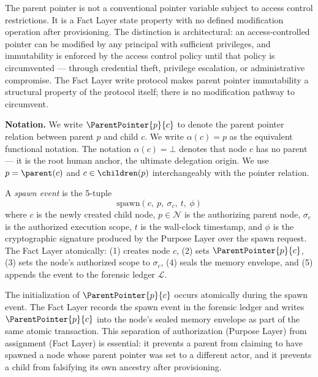 The parent pointer is not a conventional pointer variable subject to access control restrictions. It is a Fact Layer state property with no defined modification operation after provisioning. The distinction is architectural: an access-controlled pointer can be modified by any principal with sufficient privileges, and immutability is enforced by the access control policy until that policy is circumvented --- through credential theft, privilege escalation, or administrative compromise. The Fact Layer write protocol makes parent pointer immutability a structural property of the protocol itself; there is no modification pathway to circumvent.

\bigskip
\noindent\textbf{Notation.} We write $\ParentPointer{p}{c}$ to denote the parent pointer relation between parent $p$ and child $c$. We write $\alpha(c) = p$ as the equivalent functional notation. The notation $\alpha(c) = \bot$ denotes that node $c$ has no parent --- it is the root human anchor, the ultimate delegation origin. We use $p = \parent(c)$ and $c \in \children(p)$ interchangeably with the pointer relation.

\begin{dfn}
\label{dfn:spawn-event}
A \emph{spawn event} is the 5-tuple
\begin{equation}
\mathrm{spawn}(c,\ p,\ \sigma_c,\ t,\ \phi)
\end{equation}
where $c$ is the newly created child node, $p \in \mathcal{N}$ is the authorizing parent node, $\sigma_c$ is the authorized execution scope, $t$ is the wall-clock timestamp, and $\phi$ is the cryptographic signature produced by the Purpose Layer over the spawn request. The Fact Layer atomically: (1) creates node $c$, (2) sets $\ParentPointer{p}{c}$, (3) sets the node's authorized scope to $\sigma_c$, (4) seals the memory envelope, and (5) appends the event to the forensic ledger $\mathcal{L}$.
\end{dfn}

The initialization of $\ParentPointer{p}{c}$ occurs atomically during the spawn event. The Fact Layer records the spawn event in the forensic ledger and writes $\ParentPointer{p}{c}$ into the node's sealed memory envelope as part of the same atomic transaction. This separation of authorization (Purpose Layer) from assignment (Fact Layer) is essential: it prevents a parent from claiming to have spawned a node whose parent pointer was set to a different actor, and it prevents a child from falsifying its own ancestry after provisioning.

